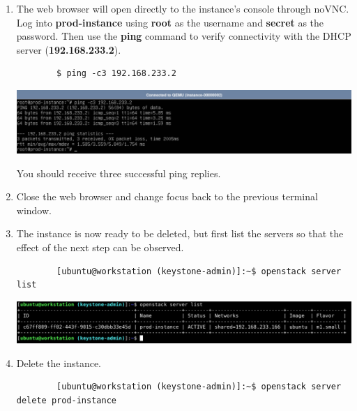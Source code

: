 \documentclass[letterpaper, 12pt]{article}
\begin{document}
\begin{enumerate}
    \item The web browser will open directly to the instance's console through noVNC.
    Log into \textbf{prod-instance} using \textbf{root} as the username and \textbf{secret} as the password.
    Then use the \textbf{ping} command to verify connectivity with the DHCP server (\textbf{192.168.233.2}).
    \begin{lstlisting}
        $ ping -c3 192.168.233.2
    \end{lstlisting}

    \begin{center}
        \includegraphics[width=\linewidth]{images/part2/step11.png}
    \end{center}

    \begin{notebox}
        You should receive three successful ping replies.
    \end{notebox}

    \item Close the web browser and change focus back to the previous terminal window.

    \item The instance is now ready to be deleted, but first list the servers so that the effect of the next step can be observed.
    \begin{lstlisting}
        [ubuntu@workstation (keystone-admin)]:~$ openstack server list
    \end{lstlisting}

    \begin{center}
        \includegraphics[width=\linewidth]{images/part2/step13.png}
    \end{center}

    \item Delete the instance.
    \begin{lstlisting}
        [ubuntu@workstation (keystone-admin)]:~$ openstack server delete prod-instance
    \end{lstlisting}


\end{enumerate}
\end{document}
